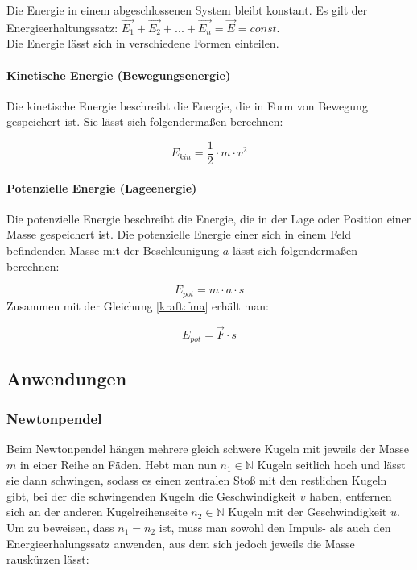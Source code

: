 \documentclass[a4paper]{article}
\begin{document}
				Die Energie in einem abgeschlossenen System bleibt konstant. Es gilt der Energieerhaltungssatz: $\vec{E_1} + \vec{E_2} + ... + \vec{E_n} = \vec{E} = const$.\\
				Die Energie lässt sich in verschiedene Formen einteilen.
				
				\paragraph{Kinetische Energie (Bewegungsenergie)}\label{energie_kin}
					Die kinetische Energie beschreibt die Energie, die in Form von Bewegung gespeichert ist. Sie lässt sich folgendermaßen berechnen:
					
					\begin{equation}\label{energie_kin_eq}
						E_{kin} = \frac{1}{2}\cdot m\cdot v^2
					\end{equation}
					
				\paragraph{Potenzielle Energie (Lageenergie)}\label{energie_pot}
					Die potenzielle Energie beschreibt die Energie, die in der Lage oder Position einer Masse gespeichert ist. Die potenzielle Energie einer sich in einem Feld befindenden Masse mit der Beschleunigung $a$ lässt sich folgendermaßen berechnen:
					
					\begin{equation}
						E_{pot} = m\cdot a \cdot s
					\end{equation}
					Zusammen mit der Gleichung \ref{kraft:fma} erhält man:
					
					\begin{equation}\label{energie:fs}
						E_{pot} = \vec{F} \cdot s
					\end{equation}
	
		\subsection{Anwendungen}
			\subsubsection{Newtonpendel}
				Beim Newtonpendel hängen mehrere gleich schwere Kugeln mit jeweils der Masse $m$ in einer Reihe an Fäden. Hebt man nun $n_1 \in \mathbb{N}$ Kugeln seitlich hoch und lässt sie dann schwingen, sodass es einen zentralen Stoß mit den restlichen Kugeln gibt, bei der die schwingenden Kugeln die Geschwindigkeit $v$ haben, entfernen sich an der anderen Kugelreihenseite $n_2 \in \mathbb{N}$ Kugeln mit der Geschwindigkeit $u$. Um zu beweisen, dass $n_1 = n_2$ ist, muss man sowohl den Impuls- als auch den Energieerhalungssatz anwenden, aus dem sich jedoch jeweils die Masse rauskürzen lässt:
				
\end{document}
